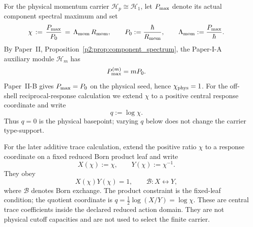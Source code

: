 \documentclass[12pt,a4paper]{article}
\begin{document}
\begin{definition}
\label{p3:def:cell-ratio}
For the physical momentum carrier \(\mathcal H_p\cong\mathcal H_1\), let
\(P_{\mathrm{max}}\) denote its actual component spectral maximum and set
\[
\chi \, := \, \frac{P_{\mathrm{max}}}{P_{0}}
\,=\,
\Lambda_{\rm mom}\,R_{\mathrm{mom}},
\qquad
P_{0}:=\frac{\hbar}{R_{\mathrm{mom}}},
\qquad
\Lambda_{\rm mom}:=\frac{P_{\mathrm{max}}}{\hbar}.
\]
By Paper~II, Proposition~\ref{p2:prop:component_spectrum}, the Paper-I-A
auxiliary module \(\mathcal H_m\) has
\[
        P_{\mathrm{max}}^{(m)}=mP_{0}.
\]
Paper~II-B gives \(P_{\mathrm{max}}=P_{0}\) on the physical seed, hence
\(\chi_{\rm phys}=1\).  For the off-shell reciprocal-response calculation we
extend \(\chi\) to a positive central response coordinate and write
\[
 q:=\log\chi.
\]
Thus \(q=0\) is the physical basepoint; varying \(q\) below does not change
the carrier type-support.
\end{definition}

\begin{definition}
\label{p3:def:pre-realization-sector-weights}
For the later additive trace calculation, extend the positive ratio
\(\chi\) to a response coordinate on a fixed reduced Born product leaf and
write
\[
        X(\chi):=\chi,
        \qquad
        Y(\chi):=\chi^{-1}.
\]
They obey
\[
        X(\chi)Y(\chi)=1,
        \qquad
        \mathcal B:X\leftrightarrow Y,
\]
where \(\mathcal B\) denotes Born exchange.  The product constraint is the fixed-leaf condition;
the quotient coordinate is \(q=\frac12\log(X/Y)=\log\chi\).
These are central trace coefficients inside the declared reduced action
domain.  They are not physical cutoff capacities and are not used to select
the finite carrier.
\end{definition}
\end{document}
